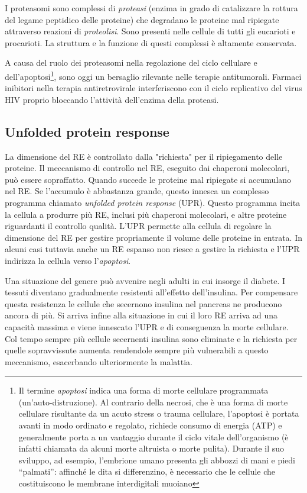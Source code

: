 \par I proteasomi sono complessi di \textit{proteasi} (enzima in grado di catalizzare la rottura del legame peptidico delle proteine) che degradano le proteine mal ripiegate attraverso reazioni di \textit{proteolisi}. Sono presenti nelle cellule di tutti gli eucarioti e procarioti. La struttura e la funzione di questi complessi è altamente conservata.

\par A causa del ruolo dei proteasomi nella regolazione del ciclo cellulare e dell'apoptosi\footnote{Il termine \textit{apoptosi} indica una forma di morte cellulare programmata (un'auto-distruzione). Al contrario della necrosi, che è una forma di morte cellulare risultante da un acuto stress o trauma cellulare, l'apoptosi è portata avanti in modo ordinato e regolato, richiede consumo di energia (ATP) e generalmente porta a un vantaggio durante il ciclo vitale dell'organismo (è infatti chiamata da alcuni morte altruista o morte pulita). Durante il suo sviluppo, ad esempio, l'embrione umano presenta gli abbozzi di mani e piedi “palmati”: affinché le dita si differenzino, è necessario che le cellule che costituiscono le membrane interdigitali muoiano}, sono oggi un bersaglio rilevante nelle terapie antitumorali. Farmaci inibitori nella terapia antiretrovirale interferiscono con il ciclo replicativo del virus HIV proprio bloccando l'attività dell'enzima della proteasi.


\subsection{Unfolded protein response}

La dimensione del RE è controllato dalla "richiesta" per il ripiegamento delle proteine. Il meccanismo di controllo nel RE, eseguito dai chaperoni molecolari, può essere sopraffatto. Quando succede le proteine mal ripiegate si accumulano nel RE. 
Se l'accumulo è abbastanza grande, questo innesca un complesso programma chiamato \textit{unfolded protein response} (UPR). Questo programma incita la cellula a produrre più RE, inclusi più chaperoni molecolari, e altre proteine riguardanti il controllo qualità. L'UPR permette alla cellula di regolare la dimensione del RE per gestire propriamente il volume delle proteine in entrata. In alcuni casi tuttavia anche un RE espanso non riesce a gestire la richiesta e l'UPR indirizza la cellula verso l'\textit{apoptosi}.

\par Una situazione del genere può avvenire negli adulti in cui insorge il diabete. I tessuti diventano gradualmente resistenti all'effetto dell'insulina. Per compensare questa resistenza le cellule che secernono insulina nel pancreas ne producono ancora di più. Si arriva infine alla situazione in cui il loro RE arriva ad una capacità massima e viene innescato l'UPR e di conseguenza la morte cellulare. Col tempo sempre più cellule secernenti insulina sono eliminate e la richiesta per quelle sopravvissute aumenta rendendole sempre più vulnerabili a questo meccanismo, esacerbando ulteriormente la malattia\supercite{alberts2018essential}.

